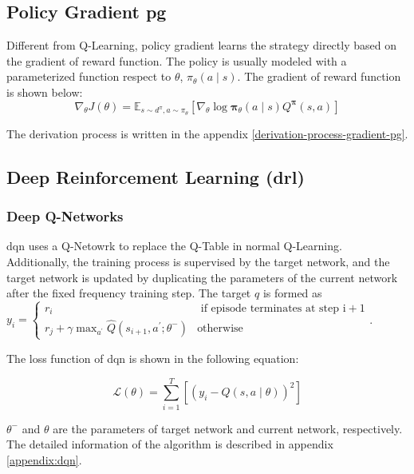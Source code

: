 \subsection{Policy Gradient \gls{pg}}
Different from Q-Learning, policy gradient learns the strategy directly based on the gradient of reward function. The policy is usually modeled with a parameterized function respect to $\theta$, $\pi_\theta \left(a \mid s\right)$. The gradient of reward function is shown below:
\begin{equation}
\nabla_{\theta} J(\theta)=\mathbb{E}_{s \sim d^{\pi}, a \sim \pi_{\theta}}\left[\nabla_{\theta} \log \boldsymbol{\pi}_{\theta}(a \mid s) Q^{\boldsymbol{\pi}}(s, a)\right]
\end{equation}

The derivation process is written in the appendix \ref{derivation-process-gradient-pg}.

\subsection{Deep Reinforcement Learning (\gls{drl})}
\subsubsection{Deep Q-Networks}
\gls{dqn} uses a Q-Netowrk to replace the Q-Table in normal Q-Learning. Additionally, the training process is supervised by the target network, and the target network is updated by duplicating the parameters of the current network after the fixed frequency training step. The target $q$ is formed as $y_{i}=\left\{\begin{array}{cc}r_{i} & \text { if episode terminates at step } \mathrm{i}+1 \\ r_{j}+\gamma \max _{a^{\prime}} \hat{Q}\left(s_{i+1}, a^{\prime} ; \theta^{-}\right) & \text {otherwise }\end{array}\right.$.

The loss function of \gls{dqn} is shown in the following equation:

\begin{equation}
\mathcal{L}(\theta)=\sum_{i=1}^{T}\left[\left(y_{i}-Q(s, a \mid \theta)\right)^{2}\right]
\end{equation}

$\theta^{-}$ and $\theta$ are the parameters of target network and current network, respectively. The detailed information of the algorithm is described in appendix \ref{appendix:dqn}.


